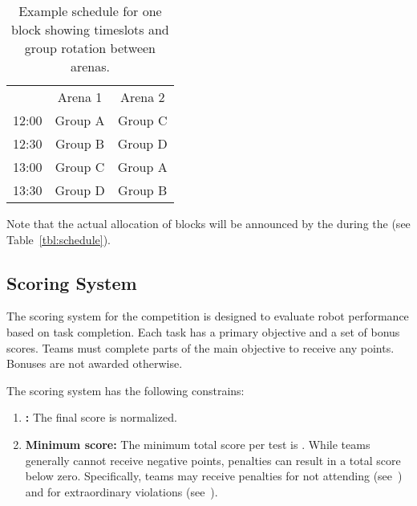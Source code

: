 \begin{table}[h]
\centering
\renewcommand{\arraystretch}{1.4}
\setlength{\tabcolsep}{10pt}
\begin{tabular}{c c c}
\rowcolor{white}  & Arena 1 & Arena 2 \\

12:00 & \cellcolor{red!30}Group A & \cellcolor{blue!30}Group C \\ 
12:30 & \cellcolor{yellow!30}Group B & \cellcolor{green!30}Group D \\ 
13:00 & \cellcolor{blue!30}Group C & \cellcolor{red!30}Group A \\ 
13:30 & \cellcolor{green!30}Group D & \cellcolor{yellow!30}Group B \\ 
\end{tabular}
\caption{Example schedule for one block showing timeslots and group rotation between arenas.}\label{tab:schedule_example_times}
\end{table}



\noindent Note that the actual allocation of blocks will be announced by the \OC{} during the \SetupDays{} (see Table~\ref{tbl:schedule}).

\subsection{Scoring System}\label{rule:score_system}

The scoring system for the competition is designed to evaluate robot performance based on task completion. Each task has a primary objective and a set of bonus scores. Teams must complete parts of the main objective to receive any points. Bonuses are not awarded otherwise.

The scoring system has the following constrains:
\begin{enumerate}
	\item \textbf{\FINAL:} The final score is normalized.
	\item \textbf{Minimum score:} The minimum total score per test is .
	While teams generally cannot receive negative points, penalties can result in a total score below zero. Specifically, teams may receive penalties for not attending (see~) and for extraordinary violations (see~).
\end{enumerate}

